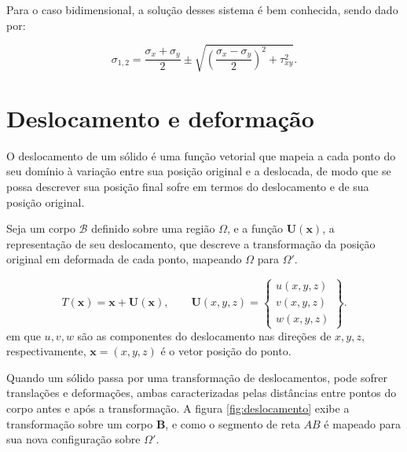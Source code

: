 Para o caso bidimensional, a solução desses sistema é bem conhecida, sendo dado por:

\begin{equation}
    \sigma_{1,2} = \frac{\sigma_x + \sigma_y}{2} \pm \sqrt{\left(\frac{\sigma_x - \sigma_y}{2}\right)^2 + \tau_{xy}^2}.
\end{equation}

\section{Deslocamento e deformação}

O deslocamento de um sólido é uma função vetorial que mapeia a cada ponto do seu domínio à variação entre sua posição original e a deslocada, de modo que se possa descrever sua posição final sofre em termos do deslocamento e de sua posição original. 

Seja um corpo $\mathcal{B}$ definido sobre uma região $\Omega$, e a função $\bm{U}(\bm{x})$, a representação de seu deslocamento, que descreve a transformação da posição original em deformada de cada ponto, mapeando $\Omega$ para $\Omega'$.

\begin{equation}
    T(\bm{x}) = \bm{x} + \bm{U}(\bm{x}), \qquad
    \bm{U}(x,y,z) = \begin{Bmatrix}
        u(x,y,z) \\ v(x,y,z) \\ w(x,y,z) 
    \end{Bmatrix}.
    \label{eq:transformacao}
\end{equation}
em que $u, v, w$ são as componentes do deslocamento nas direções de $x, y, z$, respectivamente,  $\bm{x} = (x,y,z)$ é o vetor posição do ponto.



Quando um sólido passa por uma transformação de deslocamentos, pode sofrer translações e deformações, ambas caracterizadas pelas distâncias entre pontos do corpo antes e após a transformação. A figura \ref{fig:deslocamento} exibe a transformação sobre um corpo $\bm{B}$, e como o segmento de reta $AB$ é mapeado para sua nova configuração sobre $\Omega'$.

